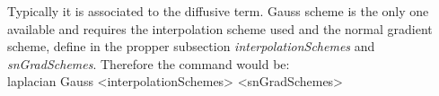 \documentclass[a4paper,12pt]{article}
\begin{document}
Typically it is associated to the diffusive term. Gauss scheme is the only one available and requires the interpolation scheme used and the normal gradient scheme, define in the propper subsection \textit{interpolationSchemes} and \textit{snGradSchemes}. Therefore the command would be:
\\ {\ttfamily laplacian	Gauss	<interpolationSchemes>		<snGradSchemes>}


\end{document}
